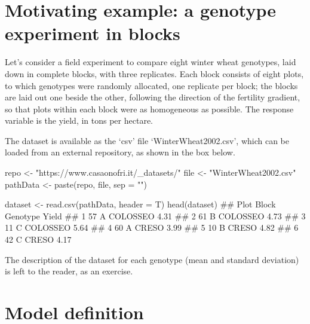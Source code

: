 \documentclass[a4paper,12pt,oneside]{book}
\newenvironment{Shaded}{\begin{snugshade}}{\end{snugshade}}
\newcommand{\StringTok}[1]{#1}
\newcommand{\DocumentationTok}[1]{#1}
\newcommand{\OtherTok}[1]{#1}
\newcommand{\FunctionTok}[1]{#1}
\newcommand{\AttributeTok}[1]{#1}
\newcommand{\NormalTok}[1]{#1}
\begin{document}
\hypertarget{motivating-example-a-genotype-experiment-in-blocks}{%
\section{Motivating example: a genotype experiment in blocks}\label{motivating-example-a-genotype-experiment-in-blocks}}

Let's consider a field experiment to compare eight winter wheat genotypes, laid down in complete blocks, with three replicates. Each block consists of eight plots, to which genotypes were randomly allocated, one replicate per block; the blocks are laid out one beside the other, following the direction of the fertility gradient, so that plots within each block were as homogeneous as possible. The response variable is the yield, in tons per hectare.

The dataset is available as the `csv' file `WinterWheat2002.csv', which can be loaded from an external repository, as shown in the box below.

\vspace{12pt}

\begin{Shaded}
\begin{Highlighting}[]
\NormalTok{repo }\OtherTok{\textless{}{-}} \StringTok{"https://www.casaonofri.it/\_datasets/"}
\NormalTok{file }\OtherTok{\textless{}{-}} \StringTok{"WinterWheat2002.csv"}
\NormalTok{pathData }\OtherTok{\textless{}{-}} \FunctionTok{paste}\NormalTok{(repo, file, }\AttributeTok{sep =} \StringTok{""}\NormalTok{)}

\NormalTok{dataset }\OtherTok{\textless{}{-}} \FunctionTok{read.csv}\NormalTok{(pathData, }\AttributeTok{header =}\NormalTok{ T)}
\FunctionTok{head}\NormalTok{(dataset)}
\DocumentationTok{\#\#   Plot Block Genotype Yield}
\DocumentationTok{\#\# 1   57     A COLOSSEO  4.31}
\DocumentationTok{\#\# 2   61     B COLOSSEO  4.73}
\DocumentationTok{\#\# 3   11     C COLOSSEO  5.64}
\DocumentationTok{\#\# 4   60     A    CRESO  3.99}
\DocumentationTok{\#\# 5   10     B    CRESO  4.82}
\DocumentationTok{\#\# 6   42     C    CRESO  4.17}
\end{Highlighting}
\end{Shaded}

The description of the dataset for each genotype (mean and standard deviation) is left to the reader, as an exercise.

\hypertarget{model-definition-1}{%
\section{Model definition}\label{model-definition-1}}
\end{document}
